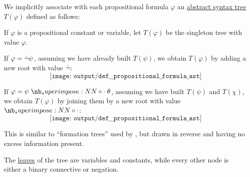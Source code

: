 \begin{definition}\label{def:propositional_formula_ast}\mimprovised
  We implicitly associate with each propositional formula \( \varphi \) an \hyperref[con:abstract_syntax_tree]{abstract syntax tree} \( T(\varphi) \) defined as follows:
  \begin{thmenum}
     If \( \varphi \) is a propositional constant or variable, let \( T(\varphi) \) be the singleton tree with value \( \varphi \).

     If \( \varphi = \dot\neg \psi \), assuming we have already built \( T(\psi) \), we obtain \( T(\varphi) \) by adding a new root with value \( \dot\neg \):
    \begin{equation*}
      \texttt{[image: output/def\_\_propositional\_formula\_ast]}
    \end{equation*}

     If \( \varphi = \psi \syncirc \theta \), assuming we have built \( T(\psi) \) and \( T(\chi) \), we obtain \( T(\varphi) \) by joining them by a new root with value \( \syncirc \):
    \begin{equation*}
      \texttt{[image: output/def\_\_propositional\_formula\_ast]}
    \end{equation*}
  \end{thmenum}
\end{definition}
\begin{comments}
  \item This is similar to \enquote{formation trees} used by , but drawn in reverse and having no excess information present.
  \item The \hyperref[def:rooted_tree/leaf]{leaves} of the tree are variables and constants, while every other node is either a binary connective or negation.
\end{comments}

